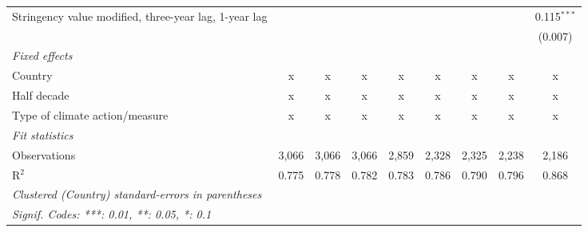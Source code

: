 \begin{table}[htbp]
\begin{tabular}{lcccccccc}
      Stringency value modified, three-year lag, 1-year lag                                      &         &         &              &               &               &               &               & 0.115$^{***}$\\   
                                                                                                 &         &         &              &               &               &               &               & (0.007)\\   
      \emph{Fixed effects}\\
      Country                                                                                    & x       & x       & x            & x             & x             & x             & x             & x\\  
      Half decade                                                                                & x       & x       & x            & x             & x             & x             & x             & x\\  
      Type of climate action/measure                                                             & x       & x       & x            & x             & x             & x             & x             & x\\  
      \midrule \emph{Fit statistics}\\
      Observations                                                                               & 3,066   & 3,066   & 3,066        & 2,859         & 2,328         & 2,325         & 2,238         & 2,186\\  
      R$^2$                                                                                      & 0.775   & 0.778   & 0.782        & 0.783         & 0.786         & 0.790         & 0.796         & 0.868\\  
      \midrule
      \multicolumn{9}{l}{\emph{Clustered (Country) standard-errors in parentheses}}\\
      \multicolumn{9}{l}{\emph{Signif. Codes: ***: 0.01, **: 0.05, *: 0.1}}\\
   \end{tabular}
\end{table}


